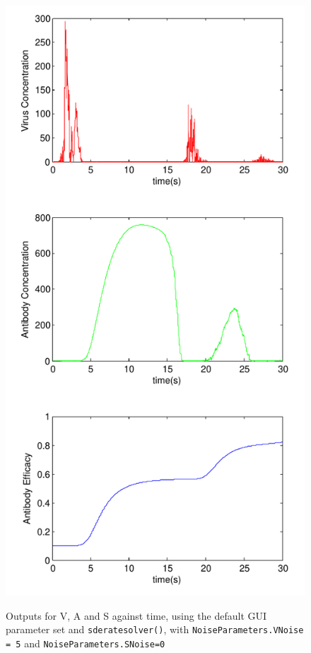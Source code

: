 \documentclass[a4paper, 12pt]{report}
\begin{document}
\begin{figure}
\begin{center}
\includegraphics[width=120mm]{Resurgance_scissored.pdf}
\label{resurgance}
\caption{Outputs for V, A and S against time, using the default GUI parameter set and \texttt{sderatesolver()}, with \texttt{NoiseParameters.VNoise = 5} and \texttt{NoiseParameters.SNoise=0}}
\end{center}
\end{figure}
\end{document}
